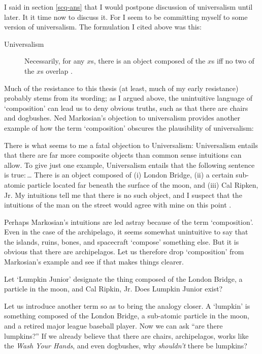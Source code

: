\documentclass[11pt]{article}
\newenvironment{squote}{%
\begin{spacing}{1}
       	\begin{list}{}{%
\setlength{\labelwidth}{0pt}%
\rightmargin\leftmargin%
}
\item\relax
}{%
\end{list}%
\end{spacing}
}
\begin{document}
\begin{spacing}{1.25}
I said in section \ref{scq-ans} that I would postpone discussion of
universalism until later.  It it time now to discuss it.  For I seem
to be committing myself to some version of universalism.  The
formulation I cited above was this:

\begin{description}
\item[Universalism] Necessarily, for any $x$s, there is an object
  composed of the $x$s iff no two of the $x$s overlap
  \citep[227]{markosian1998a}.
\end{description}

Much of the resistance to this thesis (at least, much of my early
resistance) probably stems from its wording; as I argued above, the
unintuitive language of `composition' can lead us to deny obvious
truths, such as that there are chairs and dogbushes.  Ned Markosian's
objection to universalism provides another example of how the term
`composition' obscures the plausibility of universalism:

\begin{squote}
There is what seems to me a fatal objection to Universalism:
Universalism entails that there are far more composite objects than
common sense intuitions can allow.  To give just one example,
Universalism entails that the following sentence is true:\,\ldots
There is an object composed of (i) London Bridge, (ii) a certain
sub-atomic particle located far beneath the surface of the moon, and
(iii) Cal Ripken, Jr.  My intuitions tell me that there is no such
object, and I suspect that the intuitions of the man on the street
would agree with mine on this point \citeyearpar[228]{markosian1998a}.
\end{squote}

Perhaps Markosian's intuitions are led astray because of the term
`composition'.  Even in the case of the archipelago, it seems somewhat
unintuitive to say that the islands, ruins, bones, and spacecraft
`compose' something else.  But it is obvious that there are
archipelagos.  Let us therefore drop `composition' from Markosian's
example and see if that makes things clearer.

Let `Lumpkin Junior' designate the thing composed of the London
Bridge, a particle in the moon, and Cal Ripkin, Jr.  Does Lumpkin
Junior exist?

Let us introduce another term so as to bring the analogy closer.  A
`lumpkin' is something composed of the London Bridge, a sub-atomic
particle in the moon, and a retired major league baseball player.  Now
we can ask ``are there lumpkins?''  If we already believe that there
are chairs, archipelagos, works like the {\em Wash Your Hands}, and
even dogbushes, why {\em shouldn't} there be lumpkins?


\end{spacing}
\end{document}
